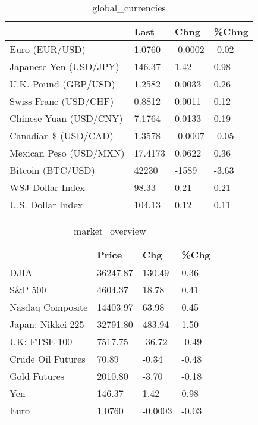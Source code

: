 \documentclass{article}%
\begin{document}
%


\begin{table}[htbp]%
\caption{global\_currencies}%
\centering%
\begin{adjustbox}{width=1\textwidth}%
\begin{tabular}{llll}
\toprule
                       &    Last &    Chng & \%Chng \\
\midrule
        Euro (EUR/USD) &  1.0760 & -0.0002 & -0.02 \\
Japanese Yen (USD/JPY) &  146.37 &    1.42 &  0.98 \\
  U.K. Pound (GBP/USD) &  1.2582 &  0.0033 &  0.26 \\
 Swiss Franc (USD/CHF) &  0.8812 &  0.0011 &  0.12 \\
Chinese Yuan (USD/CNY) &  7.1764 &  0.0133 &  0.19 \\
  Canadian \$ (USD/CAD) &  1.3578 & -0.0007 & -0.05 \\
Mexican Peso (USD/MXN) & 17.4173 &  0.0622 &  0.36 \\
     Bitcoin (BTC/USD) &   42230 &   -1589 & -3.63 \\
      WSJ Dollar Index &   98.33 &    0.21 &  0.21 \\
     U.S. Dollar Index &  104.13 &    0.12 &  0.11 \\
\bottomrule
\end{tabular}
%
\end{adjustbox}%
\end{table}

%


\begin{table}[htbp]%
\caption{market\_overview}%
\centering%
\begin{adjustbox}{width=1\textwidth}%
\begin{tabular}{llll}
\toprule
                  &    Price &     Chg &  \%Chg \\
\midrule
             DJIA & 36247.87 &  130.49 &  0.36 \\
          S\&P 500 &  4604.37 &   18.78 &  0.41 \\
 Nasdaq Composite & 14403.97 &   63.98 &  0.45 \\
Japan: Nikkei 225 & 32791.80 &  483.94 &  1.50 \\
     UK: FTSE 100 &  7517.75 &  -36.72 & -0.49 \\
Crude Oil Futures &    70.89 &   -0.34 & -0.48 \\
     Gold Futures &  2010.80 &   -3.70 & -0.18 \\
              Yen &   146.37 &    1.42 &  0.98 \\
             Euro &   1.0760 & -0.0003 & -0.03 \\
\bottomrule
\end{tabular}
%
\end{adjustbox}%
\end{table}

%
\end{document}
